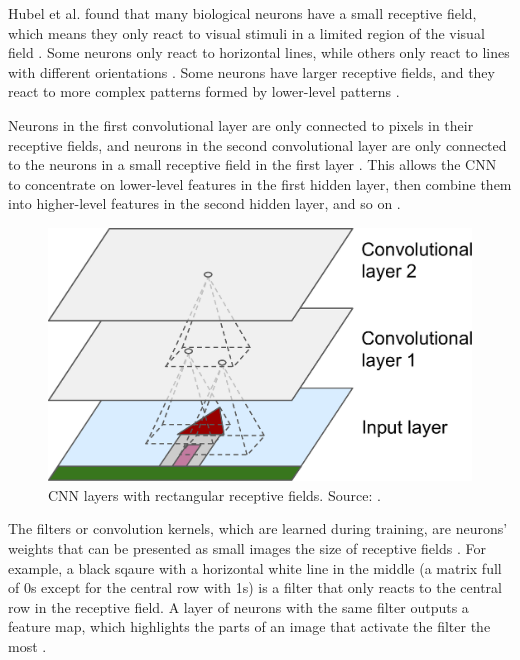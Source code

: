 \documentclass[a4paper, 11pt, oneside]{article}
\begin{document}
  Hubel et al. \cite{hubel1959single, hubel1959receptive, hubel1968receptive} found that many biological neurons have
  a small receptive field, which  means they only react to visual stimuli in a limited region of the visual field
  \cite{geron2019hands}. Some neurons only react to horizontal lines, while others only react to lines with
  different orientations \cite{geron2019hands}. Some neurons have larger receptive fields, and they react to more complex
  patterns formed by lower-level patterns \cite{geron2019hands}.

  Neurons in the first convolutional layer are only connected to pixels in their receptive fields, and neurons in the
  second convolutional layer are only connected to the neurons in a small receptive field in the first layer
  \cite{geron2019hands}. This allows the CNN to concentrate on lower-level features in the first hidden layer, then
  combine them into higher-level features in the second hidden layer, and so on \cite{geron2019hands}.

  \begin{figure}[ht]
    \begin{center}
      \includegraphics[width=.8\textwidth]{cnn_layers.png}
    \end{center}
    \caption{CNN layers with rectangular receptive fields. Source: \cite{geron2019hands}.}
  \end{figure}

  The filters or convolution kernels, which are learned during training, are neurons' weights that can be presented as
  small images the size of receptive fields \cite{geron2019hands}. For example, a black sqaure with a horizontal white
  line in the middle (a matrix full of 0s except for the central row with 1s) is a filter that only reacts to the central
  row in the receptive field. A layer of neurons with the same filter outputs a feature map, which highlights the parts
  of an image that activate the filter the most \cite{geron2019hands}.
\end{document}
